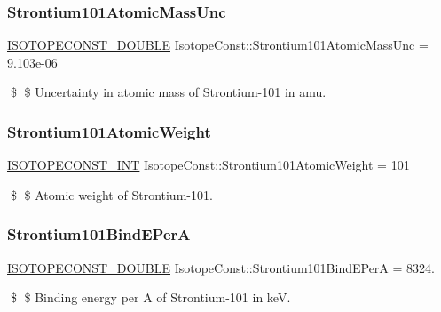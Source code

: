 \subsubsection{\texorpdfstring{Strontium101\+Atomic\+Mass\+Unc}{Strontium101AtomicMassUnc}}
{\footnotesize\ttfamily \mbox{\hyperlink{group___isotope_const-_macros_ga8f45a7272ce02c0b4c65c44636ed719a}{I\+S\+O\+T\+O\+P\+E\+C\+O\+N\+S\+T\+\_\+\+D\+O\+U\+B\+LE}} Isotope\+Const\+::\+Strontium101\+Atomic\+Mass\+Unc = 9.\+103e-\/06}

\$ \$ Uncertainty in atomic mass of Strontium-\/101 in amu. \mbox{\label{group___isotope_const-_strontium-_sr101_ga62da4ba628238048ea1529a4fdfb38ba}} 
\subsubsection{\texorpdfstring{Strontium101\+Atomic\+Weight}{Strontium101AtomicWeight}}
{\footnotesize\ttfamily \mbox{\hyperlink{group___isotope_const-_macros_ga5f18360b3e99483a35c32d789e62621c}{I\+S\+O\+T\+O\+P\+E\+C\+O\+N\+S\+T\+\_\+\+I\+NT}} Isotope\+Const\+::\+Strontium101\+Atomic\+Weight = 101}

\$ \$ Atomic weight of Strontium-\/101. \mbox{\label{group___isotope_const-_strontium-_sr101_gaa709ead1c928a23eabab34429d7ebdd3}} 
\subsubsection{\texorpdfstring{Strontium101\+Bind\+E\+PerA}{Strontium101BindEPerA}}
{\footnotesize\ttfamily \mbox{\hyperlink{group___isotope_const-_macros_ga8f45a7272ce02c0b4c65c44636ed719a}{I\+S\+O\+T\+O\+P\+E\+C\+O\+N\+S\+T\+\_\+\+D\+O\+U\+B\+LE}} Isotope\+Const\+::\+Strontium101\+Bind\+E\+PerA = 8324.}

\$ \$ Binding energy per A of Strontium-\/101 in keV. \mbox{\label{group___isotope_const-_strontium-_sr101_ga81cfa3a73f4a31c59e7548caceca7acf}} 
